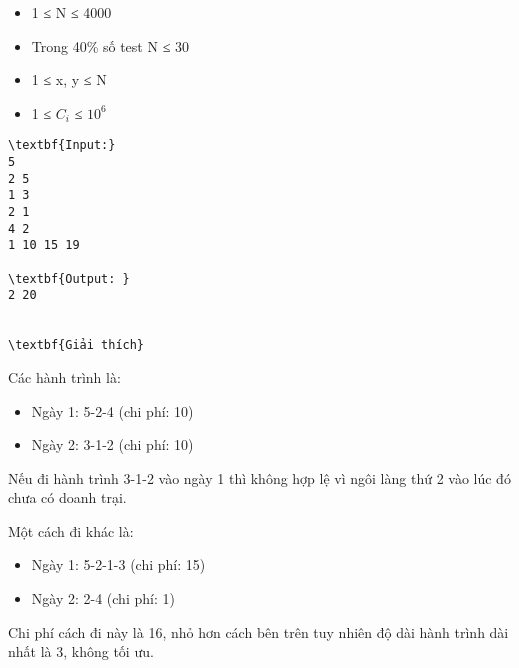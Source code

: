 \begin{itemize}
	\item 1 ≤ N ≤ 4000
	\item Trong 40\% số test N ≤ 30
	\item 1 ≤ x, y ≤ N
	\item 1 ≤ $C_{i}$ ≤ $10^{6}$
\end{itemize}
\begin{itemize}
\end{itemize}
\begin{verbatim}
\textbf{Input:}
5
2 5
1 3
2 1
4 2
1 10 15 19

\textbf{Output: }
2 20


\textbf{Giải thích}\end{verbatim}

Các hành trình là:
\begin{itemize}
	\item Ngày 1: 5-2-4 (chi phí: 10)
	\item Ngày 2: 3-1-2 (chi phí: 10)
\end{itemize}

Nếu đi hành trình 3-1-2 vào ngày 1 thì không hợp lệ vì ngôi làng thứ 2 vào lúc đó chưa có doanh trại.

Một cách đi khác là:
\begin{itemize}
	\item Ngày 1: 5-2-1-3 (chi phí: 15)
	\item Ngày 2: 2-4 (chi phí: 1)
\end{itemize}

Chi phí cách đi này là 16, nhỏ hơn cách bên trên tuy nhiên độ dài hành trình dài nhất là 3, không tối ưu.
\begin{itemize}
\end{itemize}